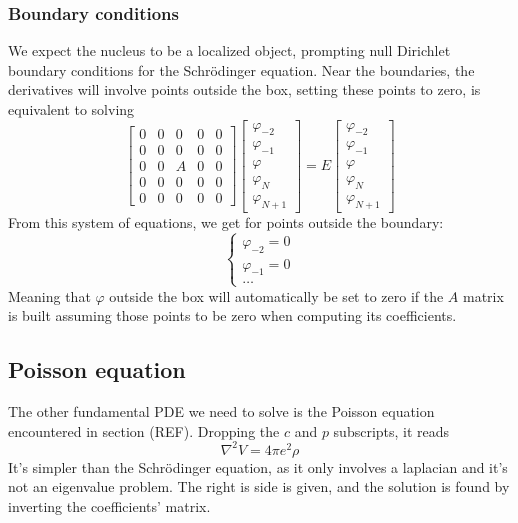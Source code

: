 \subsubsection{Boundary conditions}
We expect the nucleus to be a localized object, prompting null Dirichlet boundary conditions for the Schr\"odinger equation.
Near the boundaries, the derivatives will involve points outside the box, setting these points to zero, is equivalent to solving 
\begin{equation}
    \begin{bmatrix}
        0 & 0 & 0 & 0 & 0
        \\0 & 0 & 0 & 0 & 0
        \\0 & 0 & A & 0 & 0
        \\0 & 0 & 0 & 0 & 0
        \\0 & 0 & 0 & 0 & 0
    \end{bmatrix}
    \begin{bmatrix}
        \varphi_{-2}\\\varphi_{-1}\\\varphi\\\varphi_{N}\\ \varphi_{N+1} 
    \end{bmatrix}
    = E 
    \begin{bmatrix}
        \varphi_{-2}\\\varphi_{-1}\\\varphi\\\varphi_{N}\\ \varphi_{N+1} 
    \end{bmatrix}
\end{equation}
From this system of equations, we get for points outside the boundary:
\begin{equation}
    \begin{cases}
        \varphi_{-2} = 0\\
        \varphi_{-1} = 0\\
        \ldots
    \end{cases}
\end{equation}
Meaning that $\varphi$ outside the box will automatically be set to zero if the $A$ matrix is built assuming those points to be zero when computing its coefficients.
\subsection{Poisson equation}
\label{subsec:poisson}
The other fundamental PDE we need to solve is the Poisson equation encountered in section (REF). Dropping the $c$ and $p$ subscripts, it reads
\begin{equation*}
\nabla^2 V = 4\pi e^2 \rho
\end{equation*}
It's simpler than the Schr\"odinger equation, as it only involves a laplacian and it's not an eigenvalue problem. The right is side is given, and the solution is found by inverting the coefficients' matrix.
